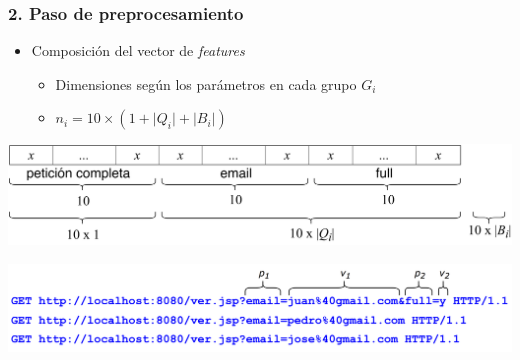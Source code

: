 \begin{frame}
    \frametitle{2. Paso de preprocesamiento}

    \begin{itemize}[<+->]
        \item
        Composición del vector de \textit{features}

        \begin{itemize}[<.->]
            \item
            Dimensiones según los parámetros en cada grupo $G_{i}$

            \item
            $ n_{i} = 10 \times \left( 1 + \lvert Q_{i} \rvert + \lvert B_{i} \rvert \right) $
        \end{itemize}
    \end{itemize}

    \begin{center}
        \includegraphics[width=\textwidth]{images/composition-vector.png}
    \end{center}

    \begin{flushleft}
        \includegraphics[width=\textwidth]{images/request-examples-1.png}
    \end{flushleft}
\end{frame}

